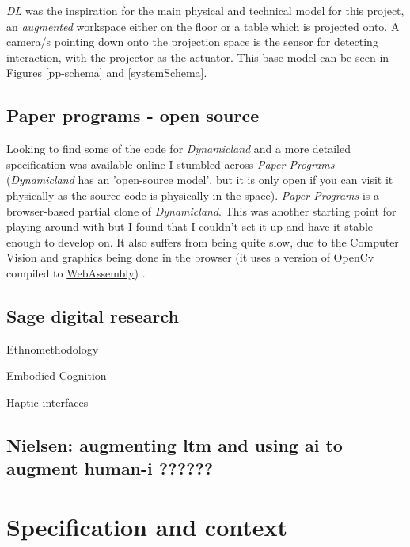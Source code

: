 \documentclass[12pt]{report}
\begin{document}
\emph{DL} was the inspiration for the main physical and technical model for
this project, an \emph{augmented} workspace either on the floor or a table which is
projected onto. A camera/s pointing down onto the projection space is the sensor
for detecting interaction, with the projector as the actuator. This base model can be
seen in Figures \ref{pp-schema} and  \ref{systemSchema}.



\section{Paper programs - open source}
\label{sec:orgedceb46}

Looking to find some of the code for \emph{Dynamicland} and a more detailed
specification was available online I stumbled across \emph{Paper Programs}
(\emph{Dynamicland} has an 'open-source model', but it is only open if you can visit
it physically as the source code is physically in the space). \emph{Paper Programs}
is a browser-based partial clone of \emph{Dynamicland}. This was another starting
point for playing around with but I found that I couldn't set it up and have it
stable enough to develop on. It also suffers from being quite slow, due to the
Computer Vision and graphics being done in the browser (it uses a
version of OpenCv compiled to \href{https://webassembly.org/}{WebAssembly}) \cite{JpPaperPrograms}.


\section{Sage digital research}
\label{sec:org5258e62}

Ethnomethodology

Embodied Cognition

Haptic interfaces

\section{Nielsen: augmenting ltm and using ai to augment human-i ??????}
\label{sec:org6956ad0}

\chapter{Specification and context}
\label{sec:org37c65bc}
\end{document}

